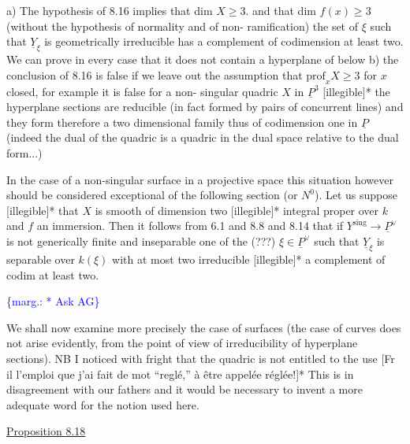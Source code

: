 \documentclass[11pt]{article}
\newcommand{\scanpage}[1]{\par\bigskip\noindent{\small\sffamily[scan #1]}\par}
\newcommand{\mspage}[1]{{\small\sffamily[p.\,#1]}}
\newcommand{\margin}[1]{\textcolor{blue}{\{\textsf{marg.:} #1\}}}
\newcommand{\uline}[1]{\underline{#1}}
\begin{document}
a) The hypothesis of 8.16 implies that dim $X \geq 3$. and that
dim $f(x) \geq 3$ (without the hypothesis of normality and of non-%
ramification) the set of $\xi$ such that $\underline{Y}_\xi$ is geometrically
irreducible has a complement of codimension at least two. We can
prove in every case that it does not contain a hyperplane of below
b) the conclusion of 8.16 is false if we leave out the assumption
that $\mathrm{prof}_x X \geq 3$ for $x$ closed, for example it is false for a non-%
singular quadric $X$ in $\underline{P}^3$ [illegible]*
the hyperplane sections are reducible (in fact formed by pairs of
concurrent lines) and they form therefore a two dimensional family
thus of codimension one in $\underline{P}$ (indeed the dual of the quadric is a
quadric in the dual space relative to the dual form...)

In the case of a non-singular surface in a projective space
this situation however should be considered exceptional of the
following section (or $N^0$). Let us suppose [illegible]* that $X$ is
smooth of dimension two [illegible]* integral proper over $k$ and $f$
an immersion. Then it follows from 6.1 and 8.8 and 8.14 that if
$Y^{\mathrm{sing}} \to \underline{P}^\vee$ is not generically finite and inseparable one of the
(???) $\xi \in \underline{P}^\vee$ such that $\underline{Y}_\xi$ is separable over $k(\xi)$ with at most two
irreducible [illegible]* a complement of codim at least two.

\margin{* Ask AG}

\clearpage
\scanpage{24/58}
\mspage{58}

We shall now examine more precisely the case of surfaces (the
case of curves does not arise evidently, from the point of view of
irreducibility of hyperplane sections).
NB  I noticed with fright that the quadric is not entitled to the
use [Fr il l'emploi que j'ai fait de mot
``reglé,'' à être appelée réglée!]*
This is in disagreement with our fathers and it would be necessary
to invent a more adequate word for the notion used here.

\uline{Proposition 8.18}
\end{document}
